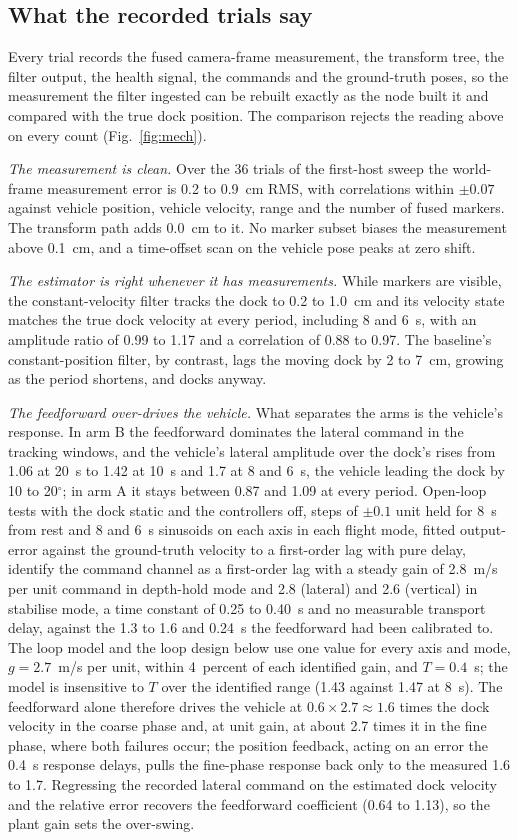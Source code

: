 \subsection{What the recorded trials say}

Every trial records the fused camera-frame measurement, the transform tree, the filter output, the health signal, the commands and the ground-truth poses, so the measurement the filter ingested can be rebuilt exactly as the node built it and compared with the true dock position. The comparison rejects the reading above on every count (Fig.~\ref{fig:mech}).

\emph{The measurement is clean.} Over the 36 trials of the first-host sweep the world-frame measurement error is 0.2 to 0.9~cm RMS, with correlations within $\pm 0.07$ against vehicle position, vehicle velocity, range and the number of fused markers. The transform path adds 0.0~cm to it. No marker subset biases the measurement above 0.1~cm, and a time-offset scan on the vehicle pose peaks at zero shift.

\emph{The estimator is right whenever it has measurements.} While markers are visible, the constant-velocity filter tracks the dock to 0.2 to 1.0~cm and its velocity state matches the true dock velocity at every period, including 8 and 6~s, with an amplitude ratio of 0.99 to 1.17 and a correlation of 0.88 to 0.97. The baseline's constant-position filter, by contrast, lags the moving dock by 2 to 7~cm, growing as the period shortens, and docks anyway.

\emph{The feedforward over-drives the vehicle.} What separates the arms is the vehicle's response. In arm B the feedforward dominates the lateral command in the tracking windows, and the vehicle's lateral amplitude over the dock's rises from 1.06 at 20~s to 1.42 at 10~s and 1.7 at 8 and 6~s, the vehicle leading the dock by 10 to 20$^\circ$; in arm A it stays between 0.87 and 1.09 at every period. Open-loop tests with the dock static and the controllers off, steps of $\pm 0.1$ unit held for 8~s from rest and 8 and 6~s sinusoids on each axis in each flight mode, fitted output-error against the ground-truth velocity to a first-order lag with pure delay, identify the command channel as a first-order lag with a steady gain of 2.8~m/s per unit command in depth-hold mode and 2.8 (lateral) and 2.6 (vertical) in stabilise mode, a time constant of 0.25 to 0.40~s and no measurable transport delay, against the 1.3 to 1.6 and 0.24~s the feedforward had been calibrated to. The loop model and the loop design below use one value for every axis and mode, $g = 2.7$~m/s per unit, within 4~percent of each identified gain, and $T = 0.4$~s; the model is insensitive to $T$ over the identified range (1.43 against 1.47 at 8~s). The feedforward alone therefore drives the vehicle at $0.6 \times 2.7 \approx 1.6$ times the dock velocity in the coarse phase and, at unit gain, at about 2.7 times it in the fine phase, where both failures occur; the position feedback, acting on an error the 0.4~s response delays, pulls the fine-phase response back only to the measured 1.6 to 1.7. Regressing the recorded lateral command on the estimated dock velocity and the relative error recovers the feedforward coefficient (0.64 to 1.13), so the plant gain sets the over-swing.


